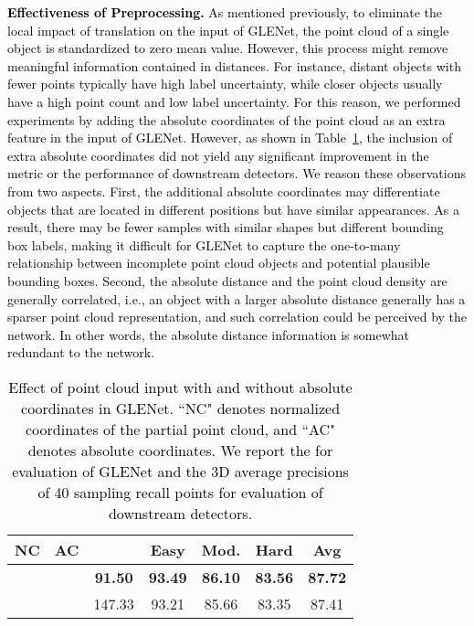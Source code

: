 \documentclass[twocolumn]{svjour3}
\newcommand{\revise}[1]{\textcolor{black}{#1}}
\begin{document}
\noindent
\revise{
	\textbf{Effectiveness of Preprocessing.} As mentioned previously, to eliminate the local impact of translation on the input of GLENet, the point cloud of a single object is standardized to zero mean value. However, this process might remove meaningful information contained in distances. For instance, distant objects with fewer points typically have high label uncertainty, while closer objects usually have a high point count and low label uncertainty.
	For this reason, we performed experiments by adding the absolute coordinates of the point cloud as an extra feature in the input of GLENet. However, as shown in Table~\ref{table:ablation_input}, the inclusion of extra absolute coordinates did not yield any significant improvement in the  metric or the performance of downstream detectors.
	We reason these observations from two aspects. First, the additional absolute coordinates may differentiate objects that are located in different positions but have similar appearances. As a result, there may be fewer samples with similar shapes but different bounding box labels, making it difficult for GLENet to capture the one-to-many relationship between incomplete point cloud objects and potential plausible bounding boxes. Second, the absolute distance and the point cloud density are generally correlated, i.e., an object with a larger absolute distance generally has a sparser point cloud representation, and such correlation could be perceived by the network. In other words, the absolute distance information is somewhat redundant to the network.
}\\

\setlength{\tabcolsep}{5pt}
\begin{table}[t]
	\centering
	\caption{\revise{Effect of point cloud input with and without absolute coordinates in GLENet. ``NC" denotes normalized coordinates of the partial point cloud, and ``AC" denotes absolute coordinates. We report the  for evaluation of GLENet and the 3D average precisions of 40 sampling recall points for evaluation of downstream detectors.}}
	\label{table:ablation_input}
	\begin{tabular}{cc|c|cccc} 
		\toprule
		NC & AC &         & Easy  & Mod.  & Hard  & Avg    \\ 
		\hline
		\checkmark                    &                        & \textbf{91.50}    & \textbf{93.49} & \textbf{86.10} & \textbf{83.56} & \textbf{87.72}  \\
		\checkmark                    & \checkmark                      & 147.33 & 93.21 & 85.66 & 83.35 & 87.41  \\
		\bottomrule
	\end{tabular}
\end{table}
\setlength{\tabcolsep}{1.5pt}
\end{document}
